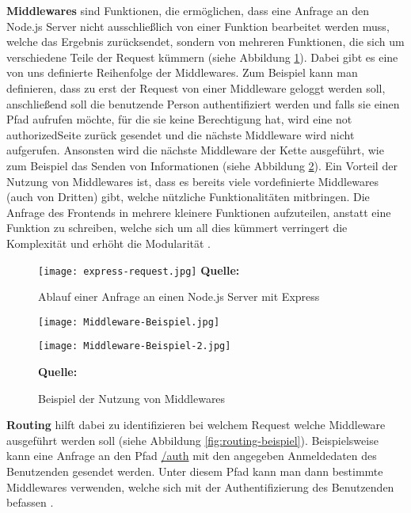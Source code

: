 \textbf{Middlewares} sind Funktionen, die ermöglichen, dass eine Anfrage an den Node.js Server nicht ausschließlich von einer Funktion bearbeitet werden muss, welche das Ergebnis zurücksendet, sondern von mehreren Funktionen, die sich um verschiedene Teile der Request kümmern (siehe Abbildung \ref{fig:express-request}). Dabei gibt es eine von uns definierte Reihenfolge der Middlewares. Zum Beispiel kann man definieren, dass zu erst der Request von einer Middleware geloggt werden soll, anschließend soll die benutzende Person authentifiziert werden und falls sie einen Pfad aufrufen möchte, für die sie keine Berechtigung hat, wird eine \glqq not authorized\grqq{ }Seite zurück gesendet und die nächste Middleware wird nicht aufgerufen. Ansonsten wird die nächste Middleware der Kette ausgeführt, wie zum Beispiel das Senden von Informationen (siehe Abbildung \ref{fig:middleware-beispiel}). Ein Vorteil der Nutzung von Middlewares ist, dass es bereits viele vordefinierte Middlewares (auch von Dritten) gibt, welche nützliche Funktionalitäten mitbringen. Die Anfrage des Frontends in mehrere kleinere Funktionen aufzuteilen, anstatt eine Funktion zu schreiben, welche sich um all dies kümmert verringert die Komplexität und erhöht die Modularität \cite{expressbook}.

  \begin{figure}[h]
  \centering
  \texttt{[image: express-request.jpg]}
\raggedleft
    \footnotesize\sffamily\textbf{Quelle:} \cite{expressbook}
  \caption{Ablauf einer Anfrage an einen Node.js Server mit Express}
  \label{fig:express-request}
\end{figure}



  \begin{figure}[h!]
  \centering
  \texttt{[image: Middleware-Beispiel.jpg]}
  
  \vspace{10mm}
  
  \texttt{[image: Middleware-Beispiel-2.jpg]}
  
\raggedleft
    \footnotesize\sffamily\textbf{Quelle:} \cite{expressbook}
  \caption{Beispiel der Nutzung von Middlewares}
  \label{fig:middleware-beispiel}
\end{figure}

\textbf{Routing} hilft dabei zu identifizieren bei welchem Request welche Middleware ausgeführt werden soll (siehe Abbildung \ref{fig:routing-beispiel}). Beispielsweise kann eine Anfrage an den Pfad \url{/auth} mit den angegeben Anmeldedaten des Benutzenden gesendet werden. Unter diesem Pfad kann man dann bestimmte Middlewares verwenden, welche sich mit der Authentifizierung des Benutzenden befassen \cite{expressbook}.

